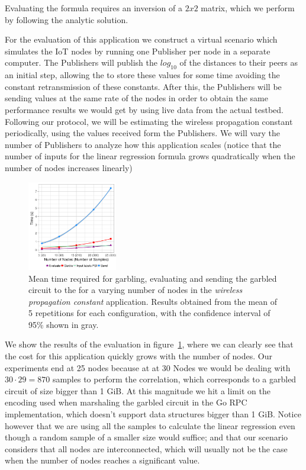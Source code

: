 Evaluating the formula requires an inversion of a $2 x 2$ matrix, which we perform
by following the analytic solution.

For the evaluation of this application we construct a virtual scenario which
simulates the IoT nodes by running one Publisher per node in a separate
computer.  The Publishers will publish the $log_{10}$ of the distances to their
peers as an initial step, allowing the \broker to store these values for some
time avoiding the constant retransmission of these constants.  After this, the
Publishers will be sending values at the same rate of the nodes in order to
obtain the same performance results we would get by using live data from the
actual testbed.  Following our protocol, we will be estimating the wireless
propagation constant periodically, using the values received form the
Publishers.  We will vary the number of Publishers to analyze how this
application scales (notice that the number of inputs for the linear regression
formula grows quadratically when the number of nodes increases linearly)

\begin{figure}
  \includegraphics[width=0.35\textwidth]{plots/turonet.png}
  \caption{Mean time required for garbling, evaluating and sending the garbled
    circuit to the \broker for a varying number of nodes in the \emph{wireless
    propagation constant} application.  Results obtained from the mean of 5
    repetitions for each configuration, with the confidence interval of 95\% shown
    in gray.}
  \label{turonet-times}
\end{figure}

We show the results of the evaluation in figure~\ref{turonet-times}, where we
can clearly see that the cost for this application quickly grows with the
number of nodes.  Our experiments end at 25 nodes because at at 30 Nodes we
would be dealing with $30 \cdot 29 = 870$ samples to perform the correlation,
which corresponds to a garbled circuit of size bigger than 1 GiB.  At this
magnitude we hit a limit on the encoding used when marshaling the garbled
circuit in the Go RPC implementation, which doesn't support data structures
bigger than 1 GiB.  Notice however that we are using all the samples to
calculate the linear regression even though a random sample of a smaller size
would suffice; and that our scenario considers that all nodes are
interconnected, which will usually not be the case when the number of nodes
reaches a significant value.


